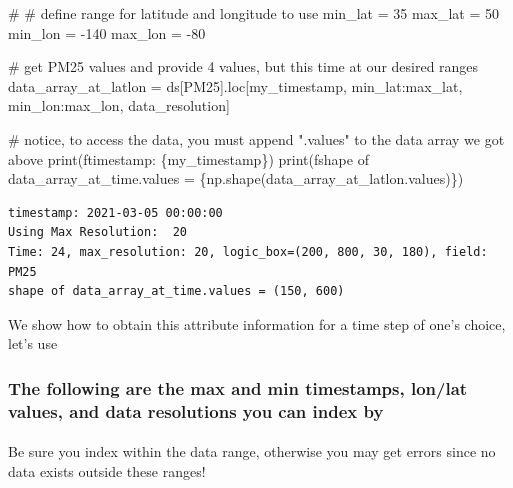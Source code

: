 \documentclass[
  letterpaper,
  DIV=11,
  numbers=noendperiod]{scrreprt}
\makeatletter
\let\oldparagraph\paragraph
\renewcommand{\paragraph}{
    \@ifstar
      \xxxParagraphStar
      \xxxParagraphNoStar
  }
\newcommand{\xxxParagraphStar}[1]{\oldparagraph*{#1}\mbox{}}
\newcommand{\xxxParagraphNoStar}[1]{\oldparagraph{#1}\mbox{}}
\newenvironment{Shaded}{\begin{snugshade}}{\end{snugshade}}
\newcommand{\BuiltInTok}[1]{\textcolor[rgb]{0.00,0.23,0.31}{#1}}
\newcommand{\CommentTok}[1]{\textcolor[rgb]{0.37,0.37,0.37}{#1}}
\newcommand{\DecValTok}[1]{\textcolor[rgb]{0.68,0.00,0.00}{#1}}
\newcommand{\NormalTok}[1]{\textcolor[rgb]{0.00,0.23,0.31}{#1}}
\newcommand{\OperatorTok}[1]{\textcolor[rgb]{0.37,0.37,0.37}{#1}}
\newcommand{\SpecialCharTok}[1]{\textcolor[rgb]{0.37,0.37,0.37}{#1}}
\newcommand{\SpecialStringTok}[1]{\textcolor[rgb]{0.13,0.47,0.30}{#1}}
\newcommand{\StringTok}[1]{\textcolor[rgb]{0.13,0.47,0.30}{#1}}
\makeatother
\begin{document}
\begin{Shaded}
\begin{Highlighting}[]
\CommentTok{\# \# define range for latitude and longitude to use}
\NormalTok{min\_lat }\OperatorTok{=} \DecValTok{35}
\NormalTok{max\_lat }\OperatorTok{=} \DecValTok{50}
\NormalTok{min\_lon }\OperatorTok{=} \OperatorTok{{-}}\DecValTok{140}
\NormalTok{max\_lon }\OperatorTok{=} \OperatorTok{{-}}\DecValTok{80}

\CommentTok{\# get PM25 values and provide 4 values, but this time at our desired ranges}
\NormalTok{data\_array\_at\_latlon }\OperatorTok{=}\NormalTok{ ds[}\StringTok{\textquotesingle{}PM25\textquotesingle{}}\NormalTok{].loc[my\_timestamp, min\_lat:max\_lat, min\_lon:max\_lon, data\_resolution]}

\CommentTok{\# notice, to access the data, you must append ".values" to the data array we got above}
\BuiltInTok{print}\NormalTok{(}\SpecialStringTok{f\textquotesingle{}timestamp: }\SpecialCharTok{\{}\NormalTok{my\_timestamp}\SpecialCharTok{\}}\SpecialStringTok{\textquotesingle{}}\NormalTok{)}
\BuiltInTok{print}\NormalTok{(}\SpecialStringTok{f\textquotesingle{}shape of data\_array\_at\_time.values = }\SpecialCharTok{\{}\NormalTok{np}\SpecialCharTok{.}\NormalTok{shape(data\_array\_at\_latlon.values)}\SpecialCharTok{\}}\SpecialStringTok{\textquotesingle{}}\NormalTok{)}
\end{Highlighting}
\end{Shaded}

\begin{verbatim}
timestamp: 2021-03-05 00:00:00
Using Max Resolution:  20
Time: 24, max_resolution: 20, logic_box=(200, 800, 30, 180), field: PM25
shape of data_array_at_time.values = (150, 600)
\end{verbatim}

We show how to obtain this attribute information for a time step of
one's choice, let's use

\subsubsection{The following are the max and min timestamps, lon/lat
values, and data resolutions you can index
by}\label{the-following-are-the-max-and-min-timestamps-lonlat-values-and-data-resolutions-you-can-index-by}

\paragraph{Be sure you index within the data range, otherwise you may
get errors since no data exists outside these
ranges!}\label{be-sure-you-index-within-the-data-range-otherwise-you-may-get-errors-since-no-data-exists-outside-these-ranges}
\end{document}
